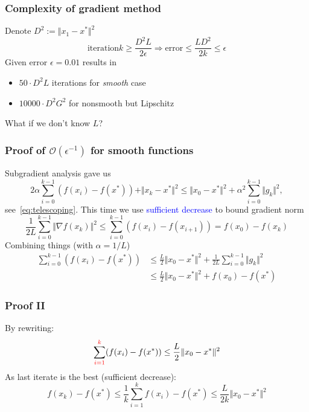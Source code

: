\documentclass{beamer}
\begin{document}
\begin{frame}
  \frametitle{Complexity of gradient method}
  Denote $D^2 := \Vert x_1- x^* \Vert^2$
  \begin{equation}
    \text{iteration} k \ge \frac{D^2 L}{2 \epsilon} \Rightarrow \text{error} \le \frac{L D^2}{2 k} \le \epsilon
  \end{equation}
  Given error $\epsilon=0.01$ results in
  \begin{itemize}
    \item $50 \cdot D^2 L$ iterations for \textit{smooth} case
      \item $10 000 \cdot D^2 G^2$ for nonsmooth but Lipschitz
  \end{itemize}

  What if we don't know $L$?
\end{frame}

\begin{frame}
  \frametitle{Proof of $\mathcal{O}(\epsilon^{-1})$ for smooth functions}
    Subgradient analysis gave us
    \begin{equation}
      2 \alpha \sum_{i=0}^{k-1} (f(x_i) - f(x^*)) + \Vert x_{k} - x^* \Vert^2 \le \Vert x_0-x^* \Vert^2 +  \alpha^2 \sum_{i=0}^{k-1}  \Vert g_k \Vert^2,
    \end{equation}
    see~\eqref{eq:telescoping}. This time we use \textcolor{blue}{sufficient decrease} to bound gradient norm
    \begin{equation}
      \frac{1}{2 L} \sum_{i=0}^{k-1} \Vert \nabla f(x_k) \Vert^2 \le \sum_{i=0}^{k-1} (f(x_i) - f(x_{i+1})) = f(x_0) - f(x_k)
    \end{equation}
    Combining things (with $\alpha=1/L$)
    \begin{equation}
      \begin{aligned}
        \sum_{i=0}^{k-1} (f(x_i) - f(x^*))  &\le \frac{L}{2} \Vert x_0-x^* \Vert^2 +  \frac{1}{2L} \sum_{i=0}^{k-1}  \Vert g_k \Vert^2 \\
        &\le \frac{L}{2} \Vert x_0-x^* \Vert^2 + f(x_0) - f(x^*)
      \end{aligned}
    \end{equation}
\end{frame}

\begin{frame}
  \frametitle{Proof II}
  By rewriting:
    \begin{equation}
      \sum_{\textcolor{red}{i=1}}^{\textcolor{red}{k}} (f(x_i) - f(x^*)) \le \frac{L}{2} \Vert x_0-x^* \Vert^2
    \end{equation}
    As last iterate is the best (sufficient decrease):
    \begin{equation}
      f(x_k) - f(x^*) \le \frac{1}{k} \sum_{i=1}^{k} f(x_i) - f(x^*) \le \frac{L}{2 k} \Vert x_0 - x^* \Vert^2
    \end{equation}
\end{frame}
\end{document}

